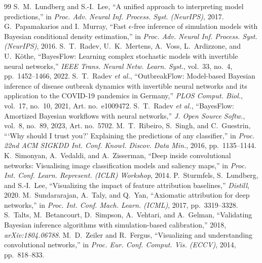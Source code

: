 \documentclass[conference]{IEEEtran}
\begin{document}
\begin{thebibliography}{99}
 S.~M.~Lundberg and S.-I.~Lee, ``A unified approach to interpreting model predictions,'' in \emph{Proc. Adv. Neural Inf. Process. Syst. (NeurIPS)}, 2017.
 G.~Papamakarios and I.~Murray, ``Fast $\epsilon$-free inference of simulation models with Bayesian conditional density estimation,'' in \emph{Proc. Adv. Neural Inf. Process. Syst. (NeurIPS)}, 2016.
 S.~T.~Radev, U.~K.~Mertens, A.~Voss, L.~Ardizzone, and U.~K\"othe, ``BayesFlow: Learning complex stochastic models with invertible neural networks,'' \emph{IEEE Trans. Neural Netw. Learn. Syst.}, vol.~33, no.~4, pp.~1452--1466, 2022.
 S.~T.~Radev \emph{et al.}, ``OutbreakFlow: Model-based Bayesian inference of disease outbreak dynamics with invertible neural networks and its application to the COVID-19 pandemics in Germany,'' \emph{PLOS Comput. Biol.}, vol.~17, no.~10, 2021, Art. no.~e1009472.
 S.~T.~Radev \emph{et al.}, ``BayesFlow: Amortized Bayesian workflows with neural networks,'' \emph{J. Open Source Softw.}, vol.~8, no.~89, 2023, Art. no.~5702.
 M.~T.~Ribeiro, S.~Singh, and C.~Guestrin, ```Why should I trust you?' Explaining the predictions of any classifier,'' in \emph{Proc. 22nd ACM SIGKDD Int. Conf. Knowl. Discov. Data Min.}, 2016, pp.~1135--1144.
 K.~Simonyan, A.~Vedaldi, and A.~Zisserman, ``Deep inside convolutional networks: Visualising image classification models and saliency maps,'' in \emph{Proc. Int. Conf. Learn. Represent. (ICLR) Workshop}, 2014.
 P.~Sturmfels, S.~Lundberg, and S.-I.~Lee, ``Visualizing the impact of feature attribution baselines,'' \emph{Distill}, 2020.
 M.~Sundararajan, A.~Taly, and Q.~Yan, ``Axiomatic attribution for deep networks,'' in \emph{Proc. Int. Conf. Mach. Learn. (ICML)}, 2017, pp.~3319--3328.
 S.~Talts, M.~Betancourt, D.~Simpson, A.~Vehtari, and A.~Gelman, ``Validating Bayesian inference algorithms with simulation-based calibration,'' 2018, \emph{arXiv:1804.06788}.
 M.~D.~Zeiler and R.~Fergus, ``Visualizing and understanding convolutional networks,'' in \emph{Proc. Eur. Conf. Comput. Vis. (ECCV)}, 2014, pp.~818--833.
\end{thebibliography}
\end{document}
